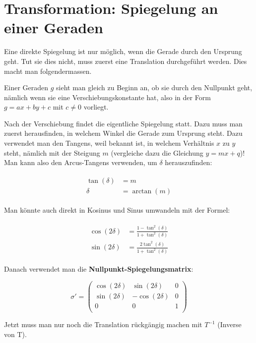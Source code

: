 \newpage

\section{Transformation: Spiegelung an einer Geraden}
Eine direkte Spiegelung ist nur möglich, wenn die Gerade durch den Ursprung geht. Tut sie dies nicht, muss zuerst eine Translation durchgeführt werden. Dies macht man folgendermassen.

Einer Geraden $g$ sieht man gleich zu Beginn an, ob sie durch den Nullpunkt geht, nämlich wenn sie eine Verschiebungskonstante hat, also in der Form $g = ax + by + c$ mit $c \neq 0$ vorliegt.

Nach der Verschiebung findet die eigentliche Spiegelung statt. Dazu muss man zuerst herausfinden, in welchem Winkel die Gerade zum Ursprung steht. Dazu verwendet man den Tangens, weil bekannt ist, in welchem Verhältnis $x$ zu $y$ steht, nämlich mit der Steigung $m$ (vergleiche dazu die Gleichung $y = mx + q$)! Man kann also den Arcus-Tangens verwenden, um $\delta$ herauszufinden:

\begin{align}
\begin{split}
\tan (\delta) &= m \\
\delta &= \arctan (m)
\end{split}
\end{align}

Man könnte auch direkt in Kosinus und Sinus umwandeln mit der Formel:

\begin{align}
\begin{split}
\cos (2\delta) &= \frac{1-\tan^2 (\delta)}{1+\tan^2 (\delta)}\\
\sin (2\delta) &= \frac{2\tan^2 (\delta)}{1+\tan^2 (\delta)}
\end{split}
\end{align}

Danach verwendet man die \textbf{Nullpunkt-Spiegelungsmatrix}:

\[
\sigma' =\begin{pmatrix}
\cos (2\delta) & \sin (2\delta) & 0\\
\sin (2\delta) & -\cos (2\delta) & 0\\
0 & 0 & 1\\
\end{pmatrix}
\]

Jetzt muss man nur noch die Translation rückgängig machen mit $T^{-1}$ (Inverse von T).

